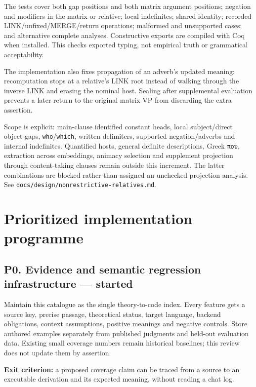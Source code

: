 \documentclass[11pt,a4paper]{article}
\begin{document}
The tests cover both gap positions and both matrix argument positions;
negation and modifiers in the matrix or relative; local indefinites;
shared identity; recorded LINK/unfixed/MERGE/return operations;
malformed and unsupported cases; and alternative complete analyses.
Constructive exports are compiled with Coq when installed. This checks
exported typing, not empirical truth or grammatical acceptability.

The implementation also fixes propagation of an adverb's updated
meaning: recomputation stops at a relative's LINK root instead of
walking through the inverse LINK and erasing the nominal host. Sealing
after supplemental evaluation prevents a later return to the original
matrix VP from discarding the extra assertion.

Scope is explicit: main-clause identified constant heads, local
subject/direct object gaps, \texttt{who}/\texttt{which}, written
delimiters, supported negation/adverbs and internal indefinites.
Quantified hosts, general definite descriptions, Greek \texttt{που},
extraction across embeddings, animacy selection and supplement
projection through content-taking clauses remain outside this increment.
The latter combinations are blocked rather than assigned an unchecked
projection analysis. See
\nolinkurl{docs/design/nonrestrictive-relatives.md}.

\section{Prioritized implementation
programme}\label{prioritized-implementation-programme}

\subsection{P0. Evidence and semantic regression infrastructure ---
started}\label{p0.-evidence-and-semantic-regression-infrastructure-started}

Maintain this catalogue as the single theory-to-code index. Every
feature gets a source key, precise passage, theoretical status, target
language, backend obligations, context assumptions, positive meanings
and negative controls. Store authored examples separately from published
judgments and held-out evaluation data. Existing small coverage numbers
remain historical baselines; this review does not update them by
assertion.

\textbf{Exit criterion:} a proposed coverage claim can be traced from a
source to an executable derivation and its expected meaning, without
reading a chat log.
\end{document}
